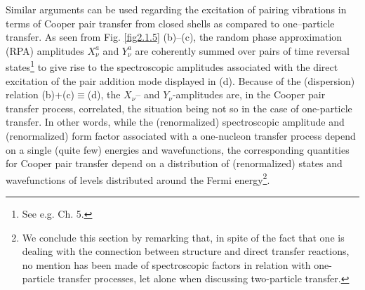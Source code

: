 Similar arguments can be used regarding the excitation of pairing vibrations in terms of Cooper pair transfer from closed shells as compared to one--particle transfer. As seen from Fig. \ref{fig2.1.5} (b)--(c), the random phase approximation (RPA) amplitudes $X_\nu^a$ and $Y^a_\nu$ are coherently summed over pairs of time reversal states\footnote{See e.g. \cite{Brink:05} Ch. 5.} to give rise to the spectroscopic amplitudes associated with the direct excitation of the pair addition mode displayed in (d). Because of the (dispersion) relation (b)+(c)$\equiv$(d), the $X_\nu$-- and $Y_\nu$-amplitudes are, in the Cooper pair transfer process, correlated, the situation being not so in the case of one-particle transfer. In other words, while the (renormalized) spectroscopic amplitude and (renormalized) form factor associated with a one-nucleon transfer process depend on a single (quite few) energies and wavefunctions, the corresponding quantities for Cooper pair transfer depend on a distribution of (renormalized) states and  wavefunctions of levels distributed around the Fermi energy\footnote{We conclude this section by remarking that, in spite of the fact that one is dealing with the connection between structure and direct transfer reactions, no mention has been made of spectroscopic factors in relation with one-particle transfer processes, let alone when discussing two-particle transfer.}. 
